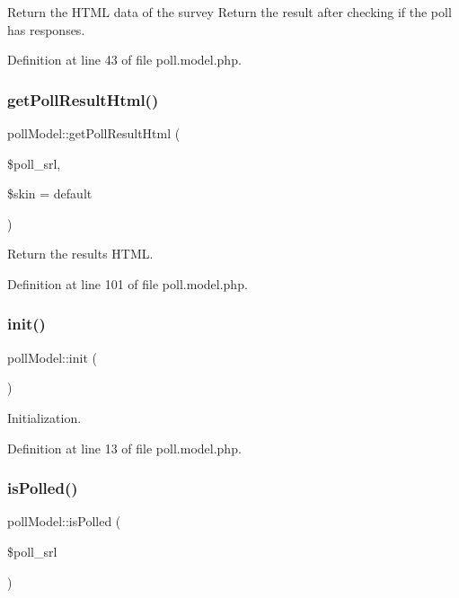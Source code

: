 Return the H\+T\+ML data of the survey Return the result after checking if the poll has responses. 



Definition at line 43 of file poll.\+model.\+php.

\hypertarget{classpollModel_a035246abbecec9462c8dbbab1b86bcd4}{}\label{classpollModel_a035246abbecec9462c8dbbab1b86bcd4} 
\subsubsection{\texorpdfstring{get\+Poll\+Result\+Html()}{getPollResultHtml()}}
{\footnotesize\ttfamily poll\+Model\+::get\+Poll\+Result\+Html (\begin{DoxyParamCaption}\item[{}]{\$poll\+\_\+srl,  }\item[{}]{\$skin = {\ttfamily \textquotesingle{}default\textquotesingle{}} }\end{DoxyParamCaption})}



Return the result\textquotesingle{}s H\+T\+ML. 



Definition at line 101 of file poll.\+model.\+php.

\hypertarget{classpollModel_a201866e44c1ba55917c57b15ae37f984}{}\label{classpollModel_a201866e44c1ba55917c57b15ae37f984} 
\subsubsection{\texorpdfstring{init()}{init()}}
{\footnotesize\ttfamily poll\+Model\+::init (\begin{DoxyParamCaption}{ }\end{DoxyParamCaption})}



Initialization. 



Definition at line 13 of file poll.\+model.\+php.

\hypertarget{classpollModel_a2364a327ffba2641db0722cdcf0c40d7}{}\label{classpollModel_a2364a327ffba2641db0722cdcf0c40d7} 
\subsubsection{\texorpdfstring{is\+Polled()}{isPolled()}}
{\footnotesize\ttfamily poll\+Model\+::is\+Polled (\begin{DoxyParamCaption}\item[{}]{\$poll\+\_\+srl }\end{DoxyParamCaption})}




